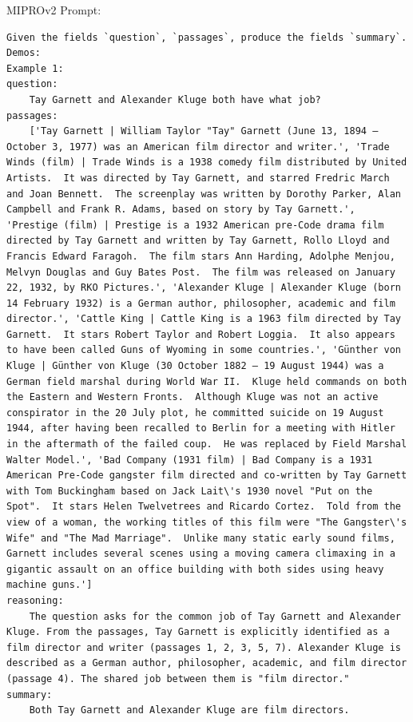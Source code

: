 \begin{instructbox}
MIPROv2 Prompt:
\begin{lstlisting}[breakindent=0pt, breaklines=true, breakatwhitespace=true, frame=single, backgroundcolor=\color{green!10}]
Given the fields `question`, `passages`, produce the fields `summary`.
Demos:
Example 1:
question:
    Tay Garnett and Alexander Kluge both have what job?
passages:
    ['Tay Garnett | William Taylor "Tay" Garnett (June 13, 1894 – October 3, 1977) was an American film director and writer.', 'Trade Winds (film) | Trade Winds is a 1938 comedy film distributed by United Artists.  It was directed by Tay Garnett, and starred Fredric March and Joan Bennett.  The screenplay was written by Dorothy Parker, Alan Campbell and Frank R. Adams, based on story by Tay Garnett.', 'Prestige (film) | Prestige is a 1932 American pre-Code drama film directed by Tay Garnett and written by Tay Garnett, Rollo Lloyd and Francis Edward Faragoh.  The film stars Ann Harding, Adolphe Menjou, Melvyn Douglas and Guy Bates Post.  The film was released on January 22, 1932, by RKO Pictures.', 'Alexander Kluge | Alexander Kluge (born 14 February 1932) is a German author, philosopher, academic and film director.', 'Cattle King | Cattle King is a 1963 film directed by Tay Garnett.  It stars Robert Taylor and Robert Loggia.  It also appears to have been called Guns of Wyoming in some countries.', 'Günther von Kluge | Günther von Kluge (30 October 1882 – 19 August 1944) was a German field marshal during World War II.  Kluge held commands on both the Eastern and Western Fronts.  Although Kluge was not an active conspirator in the 20 July plot, he committed suicide on 19 August 1944, after having been recalled to Berlin for a meeting with Hitler in the aftermath of the failed coup.  He was replaced by Field Marshal Walter Model.', 'Bad Company (1931 film) | Bad Company is a 1931 American Pre-Code gangster film directed and co-written by Tay Garnett with Tom Buckingham based on Jack Lait\'s 1930 novel "Put on the Spot".  It stars Helen Twelvetrees and Ricardo Cortez.  Told from the view of a woman, the working titles of this film were "The Gangster\'s Wife" and "The Mad Marriage".  Unlike many static early sound films, Garnett includes several scenes using a moving camera climaxing in a gigantic assault on an office building with both sides using heavy machine guns.']
reasoning:
    The question asks for the common job of Tay Garnett and Alexander Kluge. From the passages, Tay Garnett is explicitly identified as a film director and writer (passages 1, 2, 3, 5, 7). Alexander Kluge is described as a German author, philosopher, academic, and film director (passage 4). The shared job between them is "film director."
summary:
    Both Tay Garnett and Alexander Kluge are film directors.



\end{lstlisting}
\end{instructbox}
